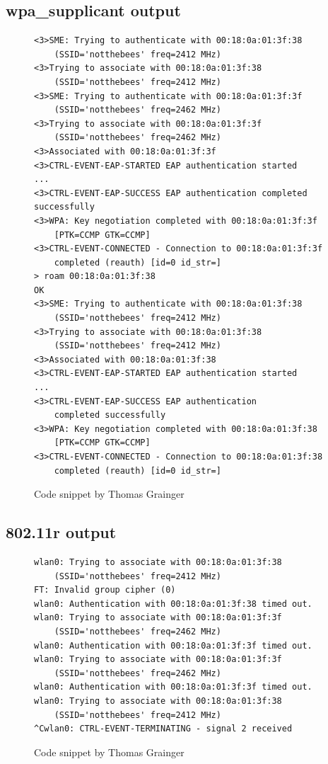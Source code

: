 \documentclass[12pt,a4paper,titlepage]{article}
\begin{document}
\subsection{wpa\_supplicant output}
\label{sec:testing-output;sub:supplicant}
\begin{figure}[h!]
\begin{Verbatim}[frame=single]
<3>SME: Trying to authenticate with 00:18:0a:01:3f:38
	(SSID='notthebees' freq=2412 MHz)
<3>Trying to associate with 00:18:0a:01:3f:38
	(SSID='notthebees' freq=2412 MHz)
<3>SME: Trying to authenticate with 00:18:0a:01:3f:3f
	(SSID='notthebees' freq=2462 MHz)
<3>Trying to associate with 00:18:0a:01:3f:3f
	(SSID='notthebees' freq=2462 MHz)
<3>Associated with 00:18:0a:01:3f:3f
<3>CTRL-EVENT-EAP-STARTED EAP authentication started
...
<3>CTRL-EVENT-EAP-SUCCESS EAP authentication completed successfully
<3>WPA: Key negotiation completed with 00:18:0a:01:3f:3f
	[PTK=CCMP GTK=CCMP]
<3>CTRL-EVENT-CONNECTED - Connection to 00:18:0a:01:3f:3f
	completed (reauth) [id=0 id_str=]
> roam 00:18:0a:01:3f:38
OK
<3>SME: Trying to authenticate with 00:18:0a:01:3f:38
	(SSID='notthebees' freq=2412 MHz)
<3>Trying to associate with 00:18:0a:01:3f:38
	(SSID='notthebees' freq=2412 MHz)
<3>Associated with 00:18:0a:01:3f:38
<3>CTRL-EVENT-EAP-STARTED EAP authentication started
...
<3>CTRL-EVENT-EAP-SUCCESS EAP authentication
	completed successfully
<3>WPA: Key negotiation completed with 00:18:0a:01:3f:38
	[PTK=CCMP GTK=CCMP]
<3>CTRL-EVENT-CONNECTED - Connection to 00:18:0a:01:3f:38
	completed (reauth) [id=0 id_str=]
\end{Verbatim}
\caption{Code snippet by Thomas Grainger}
\end{figure}

\subsection{802.11r output}
\label{sec:testing-output;sub:80211r}
\begin{figure}[h!]
\begin{Verbatim}[frame=single]
wlan0: Trying to associate with 00:18:0a:01:3f:38
	(SSID='notthebees' freq=2412 MHz)
FT: Invalid group cipher (0)
wlan0: Authentication with 00:18:0a:01:3f:38 timed out.
wlan0: Trying to associate with 00:18:0a:01:3f:3f
	(SSID='notthebees' freq=2462 MHz)
wlan0: Authentication with 00:18:0a:01:3f:3f timed out.
wlan0: Trying to associate with 00:18:0a:01:3f:3f
	(SSID='notthebees' freq=2462 MHz)
wlan0: Authentication with 00:18:0a:01:3f:3f timed out.
wlan0: Trying to associate with 00:18:0a:01:3f:38
	(SSID='notthebees' freq=2412 MHz)
^Cwlan0: CTRL-EVENT-TERMINATING - signal 2 received
\end{Verbatim}
\caption{Code snippet by Thomas Grainger}
\end{figure}
\end{document}
